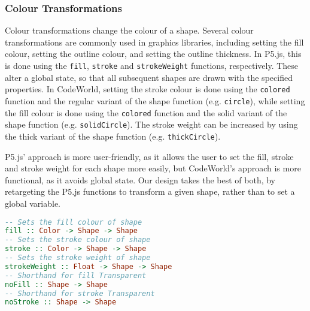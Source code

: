 \documentclass[../main.tex]{subfiles}
\begin{document}
            \subsubsection{Colour Transformations}
                Colour transformations change the colour of a shape.
                Several colour transformations are commonly used in graphics libraries,
                    including setting the fill colour, setting the outline colour, and setting the
                    outline thickness.
                In P5.js, this is done using the \texttt{fill}, \texttt{stroke} and
                    \texttt{strokeWeight} functions, respectively.
                These alter a global state, so that all subsequent shapes are drawn with the
                    specified properties.
                In CodeWorld, setting the stroke colour is done using the \texttt{colored}
                    function and the regular variant of the shape function (e.g. \texttt{circle}),
                    while setting the fill colour is done using the \texttt{colored} function and
                    the solid variant of the shape function (e.g. \texttt{solidCircle}).
                The stroke weight can be increased by using the thick variant of the shape
                    function (e.g. \texttt{thickCircle}).

                P5.js' approach is more user-friendly, as it allows the user to set the fill,
                    stroke and stroke weight for each shape more easily, but CodeWorld's approach
                    is more functional, as it avoids global state.
                Our design takes the best of both, by retargeting the P5.js functions to
                    transform a given shape, rather than to set a global variable.

                \begin{lstlisting}[language={Haskell}, label={lst:colour}, caption={The colour 
                    transformation functions.}]
-- Sets the fill colour of shape
fill :: Color -> Shape -> Shape
-- Sets the stroke colour of shape
stroke :: Color -> Shape -> Shape
-- Sets the stroke weight of shape
strokeWeight :: Float -> Shape -> Shape
-- Shorthand for fill Transparent
noFill :: Shape -> Shape
-- Shorthand for stroke Transparent
noStroke :: Shape -> Shape\end{lstlisting}
\end{document}
